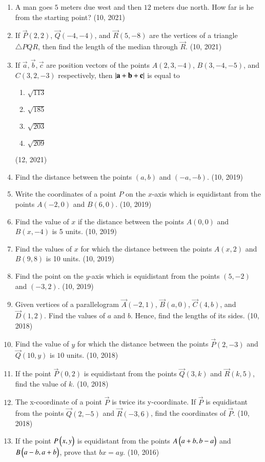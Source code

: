 \begin{enumerate}[label=\thesubsection.\arabic*, ref=\thesubsection.\theenumi]
	\item A man goes $5$ meters due west and then $12$ meters due north. How far is he from the starting point? \hfill (10, 2021)
		\item If $\vec{P}(2, 2)$, $\vec{Q}(-4, -4)$, and $\vec{R}(5, -8)$ are the vertices of a triangle $\triangle PQR$, then find the length of the median through $\vec{R}$. \hfill (10, 2021)
	\item If $\vec{a}, \vec{b}, \vec{c}$ are position vectors of the points $A(2, 3, -4)$, $B(3, -4, -5)$, and $C(3, 2, -3)$ respectively, then $\left\vert\mathbf{a}+\mathbf{b}+\mathbf{c}\right\vert$ is equal to
		\begin{enumerate}
			\item $\sqrt{113}$
			\item $\sqrt{185}$
			\item $\sqrt{203}$
			\item $\sqrt{209}$
		\end{enumerate}
	\hfill (12, 2021)
\item Find the distance between the points $(a, b)$ and $(-a, -b)$. \hfill (10, 2019)
\item Write the coordinates of a point $P$ on the $x$-axis which is equidistant from the points $A(-2, 0)$ and $B(6, 0)$. \hfill (10, 2019)
\item Find the value of $x$ if the distance between the points $A(0, 0)$ and $B(x, -4)$ is 5 units. \hfill (10, 2019)
\item Find the values of $x$ for which the distance between the points $A(x, 2)$ and $B(9, 8)$ is 10 units. \hfill (10, 2019)
\item Find the point on the $y$-axis which is equidistant from the points $(5, -2)$ and $(-3, 2)$. \hfill (10, 2019)
    \item Given vertices of a parallelogram $\vec{A}(-2,1)$, $\vec{B}(a,0)$, $\vec{C}(4,b)$, and $\vec{D}(1,2)$. Find the values of $a$ and $b$. Hence, find the lengths of its sides. \hfill (10, 2018)
    \item Find the value of $y$ for which the distance between the points $\vec{P}(2,-3)$ and $\vec{Q}(10,y)$ is $10$ units. \hfill (10, 2018)
    \item If the point $\vec{P}(0,2)$ is equidistant from the points $\vec{Q}(3,k)$ and $\vec{R}(k,5)$, find the value of $k$. \hfill (10, 2018)
    \item The x-coordinate of a point $\vec{P}$ is twice its y-coordinate. If $\vec{P}$ is equidistant from the points $\vec{Q}(2,-5)$ and $\vec{R}(-3,6)$, find the coordinates of $\vec{P}$. \hfill (10, 2018)
    \item If the point $P \begin{pmatrix}x, y\end{pmatrix}$ is equidistant from the points $A \begin{pmatrix}a+b, b-a\end{pmatrix}$ and $B \begin{pmatrix}a-b, a+b\end{pmatrix}$, prove that $bx = ay$. \hfill (10, 2016)
\end{enumerate}

